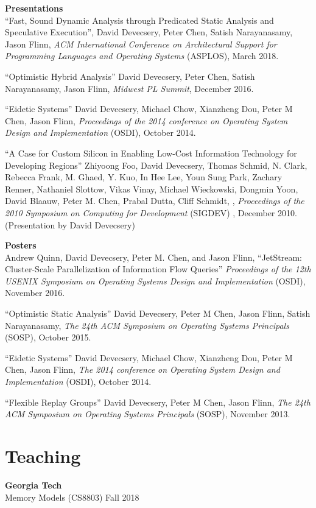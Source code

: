 \documentclass[margin, 10pt]{res} %
\begin{document}
\begin{resume}
\textbf{Presentations}\\
``Fast, Sound Dynamic Analysis through Predicated Static Analysis and
Speculative Execution'', David Devecsery, Peter Chen, Satish
Narayanasamy, Jason Flinn, {\sl ACM International Conference
on Architectural Support for Programming Languages and Operating
Systems} (ASPLOS), March 2018.

``Optimistic Hybrid Analysis'' David Devecsery, Peter Chen, Satish
Narayanasamy, Jason Flinn, {\sl Midwest PL Summit}, December 2016.

``Eidetic Systems'' David Devecsery, Michael Chow, Xianzheng Dou,
Peter M Chen, Jason Flinn, {\sl Proceedings of the 2014 conference
on Operating System Design and Implementation} (OSDI), October 2014.

``A Case for Custom Silicon in Enabling Low-Cost Information
Technology for Developing Regions'' Zhiyoong Foo, David Devecsery,
Thomas Schmid, N. Clark, Rebecca Frank, M. Ghaed, Y. Kuo, In Hee Lee,
Youn Sung Park, Zachary Renner, Nathaniel Slottow, Vikas Vinay,
Michael Wieckowski, Dongmin Yoon, David Blaauw, Peter M. Chen, Prabal
Dutta, Cliff Schmidt,  , {\sl Proceedings of the 2010 Symposium on
Computing for Development} (SIGDEV) , December 2010. (Presentation by
David Devecsery)

\textbf{Posters}\\
Andrew Quinn, David Devecsery, Peter M. Chen, and Jason Flinn,
``JetStream: Cluster-Scale Parallelization of Information Flow
Queries'' {\sl Proceedings of the 12th USENIX Symposium on Operating
Systems Design and Implementation} (OSDI), November 2016.

``Optimistic Static Analysis'' David Devecsery, Peter M Chen, Jason
Flinn, Satish Narayanasamy, {\sl The 24th ACM Symposium on Operating
Systems Principals} (SOSP), October 2015.

``Eidetic Systems'' David Devecsery, Michael Chow, Xianzheng Dou,
Peter M Chen, Jason Flinn, {\sl The 2014 conference
on Operating System Design and Implementation} (OSDI), October 2014.

``Flexible Replay Groups'' David Devecsery, Peter M Chen, Jason Flinn,
{\sl The 24th ACM Symposium on Operating Systems
Principals} (SOSP), November 2013.

\section{Teaching} \textbf{Georgia Tech} \\
Memory Models (CS8803) \hfill Fall 2018


\end{resume}
\end{document}
